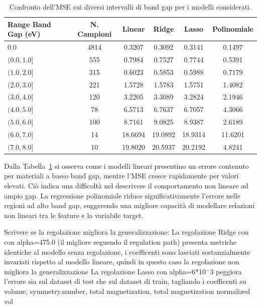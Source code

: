 \documentclass[a4paper,11pt]{article}
\begin{document}
\begin{table}[h]
\centering
\footnotesize
\caption{Confronto dell’MSE sui diversi intervalli di band gap per i modelli considerati.}
\label{tab:mse_ranges}
\begin{tabular}{lccccc}
\toprule
\textbf{Range Band Gap (eV)} & \textbf{N. Campioni} & \textbf{Linear} & \textbf{Ridge} & \textbf{Lasso} & \textbf{Polinomiale} \\
\midrule
$0.0$ & 4814 & 0.3207 & 0.3092 & 0.3141 & 0.1497 \\

$(0.0, 1.0]$ & 555 & 0.7984 & 0.7527 & 0.7744 & 0.5391 \\

$(1.0, 2.0]$ & 315 & 0.6023 & 0.5853 & 0.5988 & 0.7179 \\

$(2.0, 3.0]$ & 221 & 1.5728 & 1.5783 & 1.5751 & 1.4082 \\

$(3.0, 4.0]$ & 120 & 3.2205 & 3.3089 & 3.2824 & 2.1946 \\

$(4.0, 5.0]$ & 78 & 6.5713 & 6.7637 & 6.7057 & 4.3066 \\

$(5.0, 6.0]$ & 100 & 8.7161 & 9.0825 & 8.9387 & 2.6189 \\

$(6.0, 7.0]$ & 14 & 18.6694 & 19.0892 & 18.9314 & 11.6201 \\

$(7.0, 8.0]$ & 10 & 19.8020 & 20.5937 & 20.2192 & 4.8241 \\

\bottomrule
\end{tabular}
\end{table}

Dalla Tabella~\ref{tab:mse_ranges} si osserva come i modelli lineari presentino un errore contenuto per materiali a basso band gap, mentre l’MSE cresce rapidamente per valori elevati. Ciò indica una difficoltà nel descrivere il comportamento non lineare ad ampio gap. La regressione polinomiale riduce significativamente l’errore nelle regioni ad alto band gap, suggerendo una migliore capacità di modellare relazioni non lineari tra le feature e la variabile target.

\iffalse
Scrivere se la regolazione migliora la generalizzazione:
La regolazione Ridge con con alpha=475.0 (il migliore seguendo il regulation path) presenta metriche identiche al modello senza regolazione, i coefficenti sono lasciati sostanzialmente invariati rispetto al modello lineare, quindi in questo caso la regolazione non migliora la generalizzazione
La regolazione Lasso con alpha=6*10$^-3$ peggiora l'errore sia sul dataset di test che sul dataset di train, tagliando i coefficenti su volume, symmetry.number, total magnetization, total magnetization normalized vol
\end{document}

